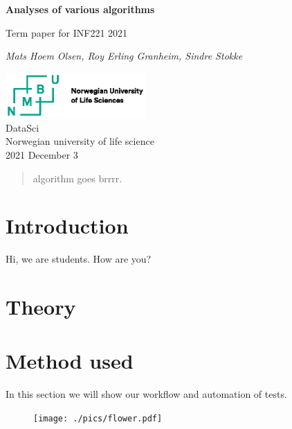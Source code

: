 \documentclass{article}
\begin{document}
\begin{titlepage}
	\begin{center}
		\vspace*{1cm}
		\Huge
		\textbf{Analyses of various algorithms}\\

		\vspace{0.5cm}
		\LARGE

		Term paper for INF221 2021\\

		\vspace{1.5cm}

		\textit{Mats Hoem Olsen, Roy Erling Granheim, Sindre Stokke}\\

		\vfill

		\includegraphics[width=0.4\textwidth]{./tex/pic/logo.eps}\\
		
		\LARGE
		DataSci\\
		Norwegian university of life science\\
		2021 December 3
	\end{center}		
\end{titlepage}

\tableofcontents
\begin{abstract}
algorithm goes brrrr.
\end{abstract}
\newpage

\section{Introduction}

Hi, we are students. How are you?\parencite[see][]{cormen_introduction_2009}

\section{Theory}



\section{Method used}

In this section we will show our workflow and automation of tests.\parencite[look at ][time: 1:23]{brady_haran_death_2020}
\begin{figure}
	\centering
	\texttt{[image: ./pics/flower.pdf]}
\end{figure}
\end{document}
